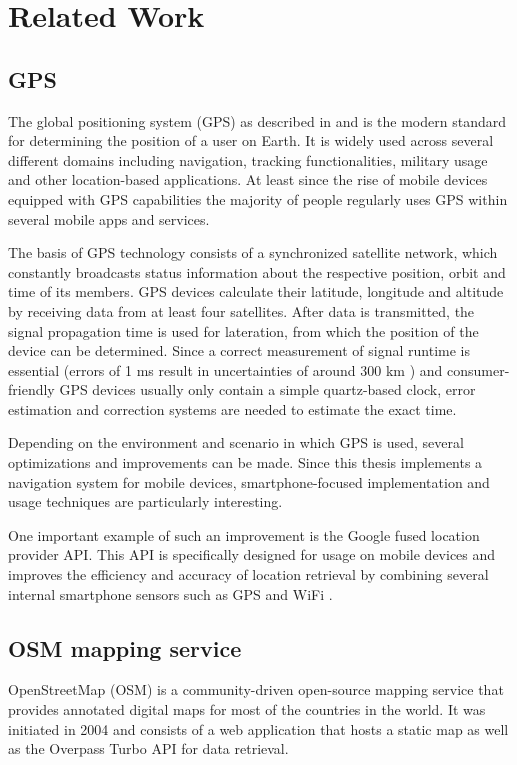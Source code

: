 \chapter{Related Work}
\label{cha:relatedwork}

\section{GPS}
The global positioning system (GPS) as described in \cite{272176} and \cite{1013999415003} is the modern standard for determining the position of a user on Earth. It is widely used across several different domains including navigation, tracking functionalities, military usage and other location-based applications. At least since the rise of mobile devices equipped with GPS capabilities the majority of people regularly uses GPS within several mobile apps and services.

The basis of GPS technology consists of a synchronized satellite network, which constantly broadcasts status information about the respective position, orbit and time of its members. GPS devices calculate their latitude, longitude and altitude by receiving data from at least four satellites. After data is transmitted, the signal propagation time is used for lateration, from which the position of the device can be determined. Since a correct measurement of signal runtime is essential (errors of 1 ms result in uncertainties of around 300 km \cite{1013999415003}) and consumer-friendly GPS devices usually only contain a simple quartz-based clock, error estimation and correction systems are needed to estimate the exact time.

Depending on the environment and scenario in which GPS is used, several optimizations and improvements can be made. Since this thesis implements a navigation system for mobile devices, smartphone-focused implementation and usage techniques are particularly interesting.

One important example of such an improvement is the Google fused location provider API. This API is specifically designed for usage on mobile devices and improves the efficiency and accuracy of location retrieval by combining several internal smartphone sensors such as GPS and WiFi \cite{fused_location_api}.

\section{OSM mapping service}
OpenStreetMap (OSM) is a community-driven open-source mapping service that provides annotated digital maps for most of the countries in the world. It was initiated in 2004 and consists of a web application \cite{openstreetmap_website} that hosts a static map as well as the Overpass Turbo API \cite{openstreetmap_overpass_turbo} for data retrieval.

